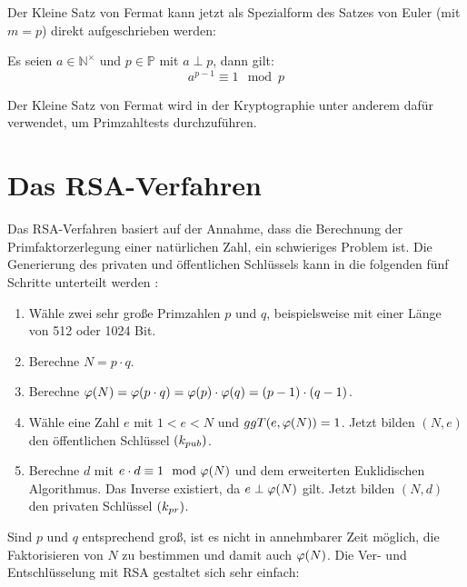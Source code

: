 \noindent
Der Kleine Satz von Fermat kann jetzt als Spezialform des Satzes von Euler (mit $m = p$) direkt
aufgeschrieben werden:

\begin{satz}
  Es seien $a \in \mathbb{N}^\times$ und $p \in \mathbb{P}$ mit $a \perp p$, dann gilt:
  \begin{equation*}
    a^{p-1} \equiv 1 \mod{p}
  \end{equation*}
\end{satz}

\noindent
Der Kleine Satz von Fermat wird in der Kryptographie unter anderem dafür verwendet,
um Primzahltests durchzuführen.

\section{Das RSA-Verfahren}
Das RSA-Verfahren basiert auf der Annahme, dass die Berechnung der Primfaktorzerlegung
einer natürlichen Zahl, ein schwieriges Problem ist.
Die Generierung des privaten und öffentlichen Schlüssels kann in die
folgenden fünf Schritte unterteilt werden \parencite[176]{BOOK:crypto}:

\begin{definition}\mbox{}
  \begin{enumerate}
    \item Wähle zwei sehr große Primzahlen $p$ und $q$, beispielsweise mit einer Länge
          von 512 oder 1024 Bit.
    \item Berechne $N = p \cdot q$.
    \item Berechne $\varphi(N) = \varphi(p \cdot q) = \varphi(p) \cdot \varphi(q) = (p-1) \cdot (q-1)$.
    \item Wähle eine Zahl $e$ mit $1 < e < N$ und $ggT(e,\varphi(N)) = 1$. Jetzt bilden
          $(N,e)$ den öffentlichen Schlüssel $(k_{pub})$.
    \item Berechne $d$ mit $e \cdot d \equiv 1 \mod{\varphi(N)}$ und dem erweiterten
          Euklidischen Algorithmus. Das Inverse existiert, da $e \perp \varphi(N)$ gilt. Jetzt bilden
          $(N,d)$ den privaten Schlüssel $(k_{pr})$.
  \end{enumerate}
\end{definition}

\noindent
Sind $p$ und $q$ entsprechend groß, ist es nicht in annehmbarer Zeit möglich, die Faktorisieren
von $N$ zu bestimmen und damit auch $\varphi(N)$. Die Ver- und Entschlüsselung mit RSA
gestaltet sich sehr einfach:

